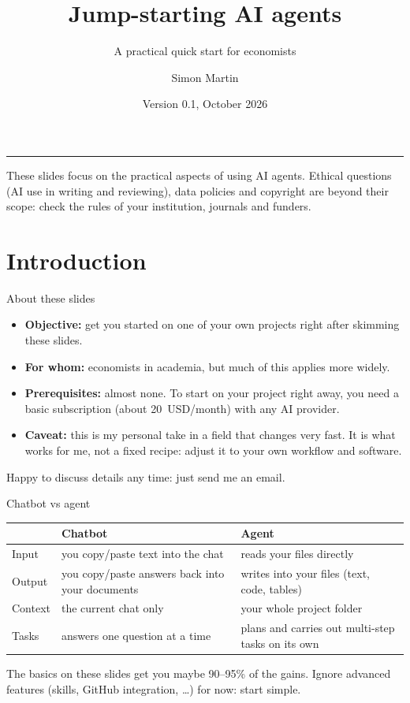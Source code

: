 \documentclass[aspectratio=169,11pt]{beamer}
\title{Jump-starting AI agents}
\subtitle{A practical quick start for economists}
\author{Simon Martin}
\institute{\footnotesize
  \faEnvelope\enspace \email\\[2pt]
  \faGlobe\enspace \href{https://sites.google.com/view/simonmartinecon/}{sites.google.com/view/simonmartinecon}\\[2pt]
  \faGithub\enspace \repourl}
\date{\footnotesize Version 0.1, October 2026}
\newcommand{\icon}[1]{\textcolor{accent}{#1}}
\newcommand{\disclaimer}{These slides focus on the practical aspects of using AI agents. Ethical questions (AI use in writing and reviewing), data policies and copyright are beyond their scope: check the rules of your institution, journals and funders.}
\begin{document}
\begin{frame}[plain]
  \titlepage
  \vfill
  {\color{rulecol}\rule{\linewidth}{0.4pt}}\par
  {\scriptsize\color{muted}\disclaimer\par}
\end{frame}

\section{Introduction}

\begin{frame}{About these slides}
  \begin{itemize}
    \item \textbf{Objective:} get you started on one of your own projects right after skimming these slides.
    \item \textbf{For whom:} economists in academia, but much of this applies more widely.
    \item \textbf{Prerequisites:} almost none. To start on your project right away, you need a basic subscription (about 20~USD/month) with any AI provider.
    \item \textbf{Caveat:} this is my personal take in a field that changes very fast. It is what works for me, not a fixed recipe: adjust it to your own workflow and software.
  \end{itemize}
  \vspace{0.5em}
  \begin{keybox}
    \icon{\faComments}\enspace Happy to discuss details any time: just send me an email.
  \end{keybox}
\end{frame}

\begin{frame}{Chatbot vs agent}
  \renewcommand{\arraystretch}{1.35}
  \begin{tabularx}{\linewidth}{@{}l Y Y@{}}
    & \icon{\faCommentDots}\enspace\textbf{Chatbot} & \icon{\faUserTie}\enspace\textbf{Agent} \\
    \midrule
    Input   & you copy/paste text into the chat & reads your files directly \\
    Output  & you copy/paste answers back into your documents & writes into your files (text, code, tables) \\
    Context & the current chat only & your whole project folder \\
    Tasks   & answers one question at a time & plans and carries out multi-step tasks on its own \\
    \bottomrule
  \end{tabularx}
  \vspace{1em}
  \begin{keybox}
    The basics on these slides get you maybe 90--95\% of the gains. Ignore advanced features (skills, GitHub integration, \dots) for now: start simple.
  \end{keybox}
\end{frame}
\end{document}
